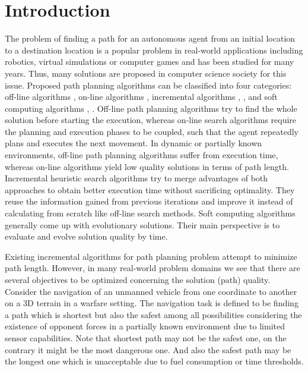 \chapter{Introduction}
\label{chapter:introduction}

The problem of finding a path for an autonomous agent from an initial location to a destination location is a popular problem in real-world applications including robotics, virtual simulations or computer games and has been studied for many years. Thus, many solutions are proposed in computer science society for this issue. Proposed path planning algorithms can be classified into four categories: off-line algorithms \cite{Dijkstra:1959} \cite{AStarHart:1968}, on-line algorithms \cite{RTAStarKorf:1990}, incremental algorithms \cite{DStar:1994}, \cite{Koenig:2002}, \cite{FocussedDStarStentz:1995} and soft computing algorithms \cite{Tarapata:2007}, \cite{Pangilinan}. Off-line path planning algorithms try to find the whole solution before starting the execution, whereas on-line search algorithms require the planning and execution phases to be coupled, such that the agent repeatedly plans and executes the next movement. In dynamic or partially known environments, off-line path planning algorithms suffer from execution time, whereas on-line algorithms yield low quality solutions in terms of path length. Incremental heuristic search algorithms try to merge advantages of both approaches to obtain better execution time without sacrificing optimality. They reuse the information gained from previous iterations and improve it instead of calculating from scratch like off-line search methods. Soft computing algorithms generally come up with evolutionary solutions. Their main perspective is to evaluate and evolve solution quality by time. 

Existing incremental algorithms for path planning problem attempt to minimize path length. However, in many real-world problem domains we see that there are several objectives to be optimized concerning the solution (path) quality. Consider the navigation of an unmanned vehicle from one coordinate to another on a 3D terrain in a warfare setting. The navigation task is defined to be finding a path which is shortest but also the safest among all possibilities considering the existence of opponent forces in a partially known environment due to limited sensor capabilities. Note that shortest path may not be the safest one, on the contrary it might be the most dangerous one. And also the safest path may be the longest one which is unacceptable due to fuel consumption or time thresholds. 

